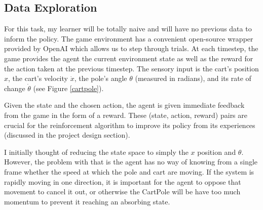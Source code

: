 \documentclass[12pt,a4paper]{article}
\begin{document}
\subsection*{Data Exploration}

For this task, my learner will be totally naive and will have no previous data to inform the policy. The game environment has a convenient open-source wrapper provided by OpenAI which allows us to step through trials.\cite{cartpole} At each timestep, the game provides the agent the current environment state as well as the reward for the action taken at the previous timestep.  The sensory input is the cart's position $x$, the cart's velocity $\dot x$, the pole's angle $\theta$ (measured in radians), and its rate of change $\dot\theta$ (see Figure \ref{cartpole}).\cite{state_def} 

Given the state and the chosen action, the agent is given immediate feedback from the game in the form of a reward. These (state, action, reward) pairs are crucial for the reinforcement algorithm to improve its policy from its experiences (discussed in the project design section).

I initially thought of reducing the state space to simply the $x$ position and $\theta$. However, the problem with that is the agent has no way of knowing from a single frame whether the speed at which the pole and cart are moving. If the system is rapidly moving in one direction, it is important for the agent to oppose that movement to cancel it out, or otherwise the CartPole will be have too much momentum to prevent it reaching an absorbing state.
\end{document}

